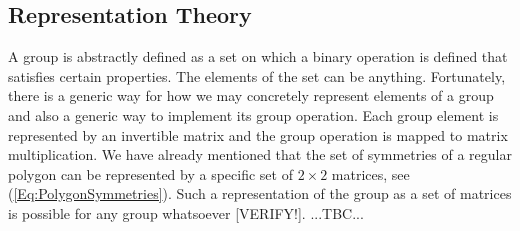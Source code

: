 





\subsection{Representation Theory}
A group is abstractly defined as a set on which a binary operation is defined that satisfies certain properties. The elements of the set can be anything. Fortunately, there is a generic way for how we may concretely represent elements of a group and also a generic way to implement its group operation. Each group element is represented by an invertible matrix and the group operation is mapped to matrix multiplication. We have already mentioned that the set of symmetries of a regular polygon can be represented by a specific set of $2 \times 2$ matrices, see (\ref{Eq:PolygonSymmetries}). Such a representation of the group as a set of matrices is possible for any group whatsoever [VERIFY!]. ...TBC...



% 




